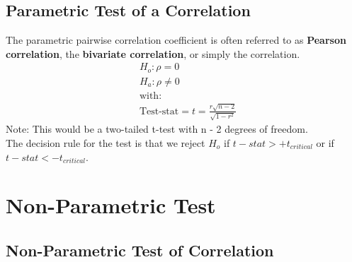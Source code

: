 \subsection{Parametric Test of a Correlation} %
\label{sub:Parametric Test of a Correlation}
The parametric pairwise correlation coefficient is often referred to as \textbf{Pearson correlation}, the \textbf{bivariate correlation}, or simply the correlation.
\begin{align*}
	& H_o: \rho = 0 \\
	& H_a: \rho \neq 0 \\
	& \text{with:} \\
	& \text{Test-stat} = t = \frac{r \sqrt{n-2}}{\sqrt{1-r^2}}
\end{align*}
Note: This would be a two-tailed t-test with n - 2 degrees of freedom.\\
The decision rule for the test is that we reject $H_o$ if $t-stat > +t_{critical}$ or if $t-stat < -t_{critical}$.
\section{Non-Parametric Test}
\label{sec:Non-Parametric Test}
\subsection{Non-Parametric Test of Correlation} %
\label{sub:Non-Parametric Test of Correlation}
